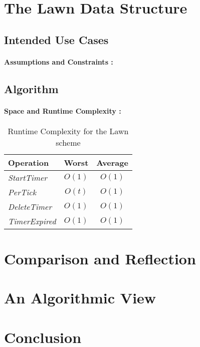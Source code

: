 \documentclass[twocolumn,a4paper]{article}
\newcommand{\advcomplexity}[9]{
\begin{table}[h!]
	\begin{center}
		\begin{tabular}{l|c|c}
			\textbf{Operation} & \textbf{Worst} & \textbf{Average} \\
			\hline
			\textit{StartTimer} & $O(#1)$ & $O(#2)$ \\
			\textit{PerTick} & $O(#3)$ & $O(#4)$ \\
			\textit{DeleteTimer} & $O(#5)$ & $O(#6)$ \\
			\textit{TimerExpired} & $O(#7)$ & $O(#8)$ \\
		\end{tabular}
		\caption{Runtime Complexity for #9 scheme}
		\label{tab:table1}
	\end{center}
\end{table}
}
\begin{document}
\section{The Lawn Data Structure}

\subsection{Intended Use Cases}

\paragraph{Assumptions and Constraints :}

\subsection{Algorithm}



\paragraph{Space and Runtime Complexity :}

\advcomplexity{1}{1}{t}{1}{1}{1}{1}{1}{the Lawn}

\section{Comparison and Reflection}

\section{An Algorithmic View}

\section{Conclusion}



\end{document}
